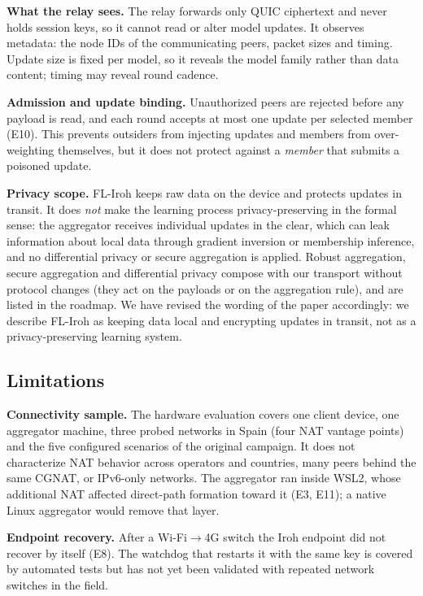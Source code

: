 \documentclass[a4paper,fleqn]{cas-dc}
\begin{document}
\textbf{What the relay sees.} The relay forwards only QUIC ciphertext and never holds session keys, so it cannot read or alter model updates. It observes metadata: the node IDs of the communicating peers, packet sizes and timing. Update size is fixed per model, so it reveals the model family rather than data content; timing may reveal round cadence.

\textbf{Admission and update binding.} Unauthorized peers are rejected before any payload is read, and each round accepts at most one update per selected member (E10). This prevents outsiders from injecting updates and members from over-weighting themselves, but it does not protect against a \emph{member} that submits a poisoned update.

\textbf{Privacy scope.} FL-Iroh keeps raw data on the device and protects updates in transit. It does \emph{not} make the learning process privacy-preserving in the formal sense: the aggregator receives individual updates in the clear, which can leak information about local data through gradient inversion or membership inference, and no differential privacy or secure aggregation is applied. Robust aggregation, secure aggregation and differential privacy compose with our transport without protocol changes (they act on the payloads or on the aggregation rule), and are listed in the roadmap. We have revised the wording of the paper accordingly: we describe FL-Iroh as keeping data local and encrypting updates in transit, not as a privacy-preserving learning system.

\subsection{Limitations}
\label{sec:limitations}

\textbf{Connectivity sample.} The hardware evaluation covers one client device, one aggregator machine, three probed networks in Spain (four NAT vantage points) and the five configured scenarios of the original campaign. It does not characterize NAT behavior across operators and countries, many peers behind the same CGNAT, or IPv6-only networks. The aggregator ran inside WSL2, whose additional NAT affected direct-path formation toward it (E3, E11); a native Linux aggregator would remove that layer.

\textbf{Endpoint recovery.} After a Wi-Fi$\to$4G switch the Iroh endpoint did not recover by itself (E8). The watchdog that restarts it with the same key is covered by automated tests but has not yet been validated with repeated network switches in the field.
\end{document}
